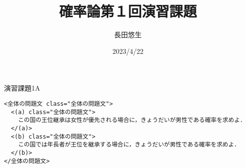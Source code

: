 \documentclass[dvipdfmx,uplatex]{jsarticle}
\title{確率論第１回演習課題}
\author{長田悠生}
\date{2023/4/22}
\begin{document}
  \begin{titlepage}
    \maketitle
    \begin{center}
      \textmc{\HUGE \LaTeX}
    \end{center}
    \thispagestyle{empty}
  \end{titlepage}

  \centerline{\huge 演習課題1A}
  \vspace{10mm}
  \begin{lstlisting}
<全体の問題文 class="全体の問題文">
  <(a) class="全体の問題文">
    この国の王位継承は女性が優先される場合に，きょうだいが男性である確率を求めよ．
  </(a)>
  <(b) class="全体の問題文">
    この国では年長者が王位を継承する場合に，きょうだいが男性である確率を求めよ．
  </(b)>
</全体の問題文>
  \end{lstlisting}
\end{document}
